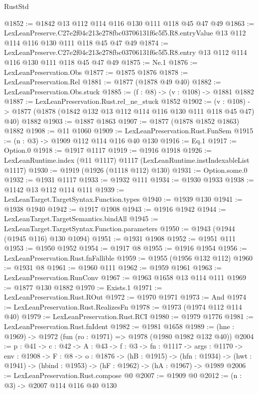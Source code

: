 \begin{lexlean}{RustStd}
\begin{coremodule}
@1852 := @1842 @13 @112 @114 @116 @130 @111 @118 @45 @47 @49
@1863 := LexLeanPreserve.C27e2f04c213e278fbc03706131f6c5f5.R8.entryValue
    @13
    @112
    @114
    @116
    @130
    @111
    @118
    @45
    @47
    @49
@1874 := LexLeanPreserve.C27e2f04c213e278fbc03706131f6c5f5.R8.entry
    @13
    @112
    @114
    @116
    @130
    @111
    @118
    @45
    @47
    @49
@1875 := Ne.{1}
@1876 := LexLeanPreservation.Obs
@1877 := @1875 @1876
@1878 := LexLeanPreservation.Rel
@1881 := @1877 (@1878 @49 @40)
@1882 := LexLeanPreservation.Obs.stuck
@1885 := (f : @8) -> (v : @108) -> @1881 @1882
@1887 := LexLeanPreservation.Rust.rel_ne_stuck @1852
@1902 := (v : @108) ->
  @1877 (@1878 (@1842 @132 @13 @112 @114 @116 @130 @111 @118 @45 @47) @40) @1882
@1903 := @1887 @1863
@1907 := @1877 (@1878 @1852 @1863) @1882
@1908 := @11 @1060
@1909 := LexLeanPreservation.Rust.FunSem
@1915 := (n : @3) -> @1909 @112 @114 @116 @40 @130
@1916 := Eq.{1}
@1917 := Option.{0}
@1918 := @1917 @1117
@1919 := @1916 @1918
@1926 := LexLeanRuntime.index (@11 @1117) @1117 (LexLeanRuntime.instIndexableList @1117)
@1930 := @1919 (@1926 (@1118 @112) @130)
@1931 := Option.some.{0}
@1932 := @1931 @1117
@1933 := @1932 @111
@1934 := @1930 @1933
@1938 := @1142 @13 @112 @114 @111
@1939 := LexLeanTarget.TargetSyntax.Function.types
@1940 := @1939 @130
@1941 := @1938 @1940
@1942 := @1917 @1908
@1943 := @1916 @1942
@1944 := LexLeanTarget.TargetSemantics.bindAll
@1945 := LexLeanTarget.TargetSyntax.Function.parameters
@1950 := @1943 (@1944 (@1945 @116) @130 @1094)
@1951 := @1931 @1908
@1952 := @1951 @111
@1953 := @1950 @1952
@1954 := @1917 @8
@1955 := @1916 @1954
@1956 := LexLeanPreservation.Rust.fnFallible
@1959 := @1955 (@1956 @132 @112)
@1960 := @1931 @8
@1961 := @1960 @111
@1962 := @1959 @1961
@1963 := LexLeanPreservation.RunConv
@1967 := @1963 @1658 @13 @114 @111
@1969 := @1877 @130 @1882
@1970 := Exists.{1}
@1971 := LexLeanPreservation.Rust.ROut
@1972 := @1970 @1971
@1973 := And
@1974 := LexLeanPreservation.Rust.RealizesFn
@1978 := @1973 (@1974 @112 @114 @40)
@1979 := LexLeanPreservation.Rust.RCI
@1980 := @1979 @1776
@1981 := LexLeanPreservation.Rust.fnIdent
@1982 := @1981 @1658
@1989 := (hne : @1969) -> @1972 (fun (ro : @1971) => @1978 (@1980 @1982 @132 @40))
@2004 := {p : @41} ->
  {c : @42} ->
  {A : @43} ->
  {f : @3} ->
  {fn : @1117} ->
  {args : @1170} ->
  {env : @1908} ->
  {F : @8} ->
  {o : @1876} ->
  (hB : @1915) ->
  (hfn : @1934) -> (hwt : @1941) -> (hbind : @1953) -> (hF : @1962) -> (hA : @1967) -> @1989
@2006 := LexLeanPreservation.Rust.compose @0
@2007 := @1909 @0
@2012 := (n : @3) -> @2007 @114 @116 @40 @130

\end{coremodule}
\end{lexlean}
